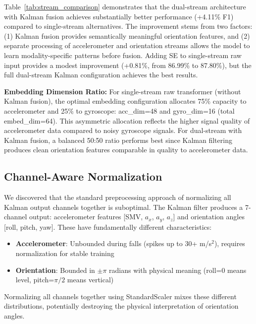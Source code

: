 Table~\ref{tab:stream_comparison} demonstrates that the dual-stream architecture with Kalman fusion achieves substantially better performance (+4.11\% F1) compared to single-stream alternatives. The improvement stems from two factors: (1) Kalman fusion provides semantically meaningful orientation features, and (2) separate processing of accelerometer and orientation streams allows the model to learn modality-specific patterns before fusion. Adding SE to single-stream raw input provides a modest improvement (+0.81\%, from 86.99\% to 87.80\%), but the full dual-stream Kalman configuration achieves the best results.

\textbf{Embedding Dimension Ratio:} For single-stream raw transformer (without Kalman fusion), the optimal embedding configuration allocates 75\% capacity to accelerometer and 25\% to gyroscope: acc\_dim=48 and gyro\_dim=16 (total embed\_dim=64). This asymmetric allocation reflects the higher signal quality of accelerometer data compared to noisy gyroscope signals. For dual-stream with Kalman fusion, a balanced 50:50 ratio performs best since Kalman filtering produces clean orientation features comparable in quality to accelerometer data.

\subsection{Channel-Aware Normalization}
\label{sec:channel_aware_norm}

We discovered that the standard preprocessing approach of normalizing all Kalman output channels together is suboptimal. The Kalman filter produces a 7-channel output: accelerometer features [SMV, $a_x$, $a_y$, $a_z$] and orientation angles [roll, pitch, yaw]. These have fundamentally different characteristics:

\begin{itemize}
    \item \textbf{Accelerometer}: Unbounded during falls (spikes up to 30+ m/s$^2$), requires normalization for stable training
    \item \textbf{Orientation}: Bounded in $\pm\pi$ radians with physical meaning (roll=0 means level, pitch=$\pi/2$ means vertical)
\end{itemize}

Normalizing all channels together using StandardScaler mixes these different distributions, potentially destroying the physical interpretation of orientation angles.

